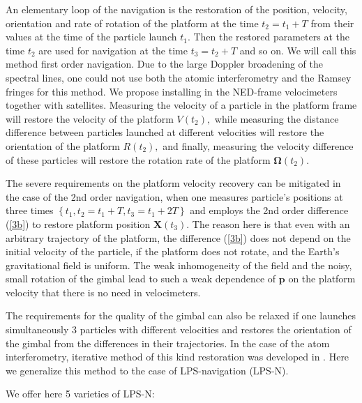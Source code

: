 \documentclass[twocolumn,showpacs,preprintnumbers]{revtex4}
\begin{document}
An elementary loop of the navigation is the restoration of the position,
velocity, orientation and rate of rotation of the platform at the time $%
t_{2}=t_{1}+T$ from their values at the time of the particle launch $t_{1}$.
Then the restored parameters at the time $t_{2}$ are used for navigation at
the time $t_{3}=t_{2}+T$ and so on. We will call this method first order
navigation. Due to the large Doppler broadening of the spectral lines, one
could not use both the atomic interferometry \cite{c1} and the Ramsey
fringes \cite{c14} for this method. We propose installing in the NED-frame
velocimeters together with satellites. Measuring the velocity of a particle
in the platform frame will restore the velocity of the platform $V\left(
t_{2}\right) ,$ while measuring the distance difference between particles
launched at different velocities will restore the orientation of the
platform $R\left( t_{2}\right) ,$ and finally, measuring the velocity
difference of these particles will restore the rotation rate of the platform 
$\mathbf{\Omega }\left( t_{2}\right) .$

The severe requirements on the platform velocity recovery can be mitigated
in the case of the 2nd order navigation, when one measures particle's
positions at three times $\left\{ t_{1},t_{2}=t_{1}+T,t_{3}=t_{1}+2T\right\} 
$ and employs the 2nd order difference (\ref{3b}) to restore platform
position $\mathbf{X}\left( t_{3}\right) $. The reason here is that even with
an arbitrary trajectory of the platform, the difference (\ref{3b}) does not
depend on the initial velocity of the particle, if the platform does not
rotate, and the Earth's gravitational field is uniform. The weak
inhomogeneity of the field and the noisy, small rotation of the gimbal lead
to such a weak dependence of $\mathbf{p}$ on the platform velocity that
there is no need in velocimeters.

The requirements for the quality of the gimbal can also be relaxed if one
launches simultaneously 3 particles with different velocities and restores
the orientation of the gimbal from the differences in their trajectories. In
the case of the atom interferometry, iterative method of this kind
restoration was developed in \cite{c13}. Here we generalize this method to
the case of LPS-navigation (LPS-N).

We offer here 5 varieties of LPS-N:
\end{document}
